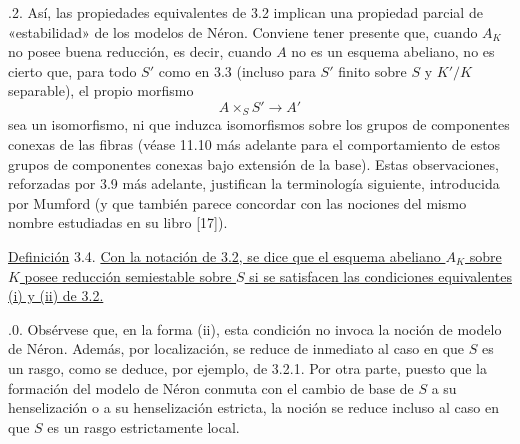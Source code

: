 \medskip
{}.2. Así, las propiedades equivalentes de 3.2 implican una propiedad
parcial de «estabilidad» de los modelos de Néron. Conviene tener presente
que, cuando $A_K$ no posee buena reducción, es decir, cuando $A$ no es
un esquema abeliano, no es cierto que, para todo $S'$ como en 3.3
(incluso para $S'$ finito sobre $S$ y $K'/K$ separable), el propio
morfismo
\[
 A\times_SS'\longrightarrow A'
\]
sea un isomorfismo, ni que induzca isomorfismos sobre los grupos de
componentes conexas de las fibras (véase 11.10 más adelante para el
comportamiento de estos grupos de componentes conexas bajo extensión
de la base). Estas observaciones, reforzadas por 3.9 más adelante,
justifican la terminología siguiente, introducida por Mumford (y que
también parece concordar con las nociones del mismo nombre estudiadas
en su libro [17]).

\medskip
\noindent
\underline{Definición} 3.4. \underline{Con la notación de 3.2, se dice
que el esquema abeliano $A_K$ sobre $K$ posee reducción semiestable
sobre $S$ si se satisfacen las condiciones equivalentes (i) y (ii) de
3.2.}

\medskip
{}.0. Obsérvese que, en la forma (ii), esta condición no invoca la
noción de modelo de Néron. Además, por localización, se reduce de
inmediato al caso en que $S$ es un rasgo, como se deduce, por ejemplo,
de 3.2.1. Por otra parte, puesto que la formación del modelo de Néron
conmuta con el cambio de base de $S$ a su henselización o a su
henselización estricta, la noción se reduce incluso al caso en que $S$
es un rasgo estrictamente local.
